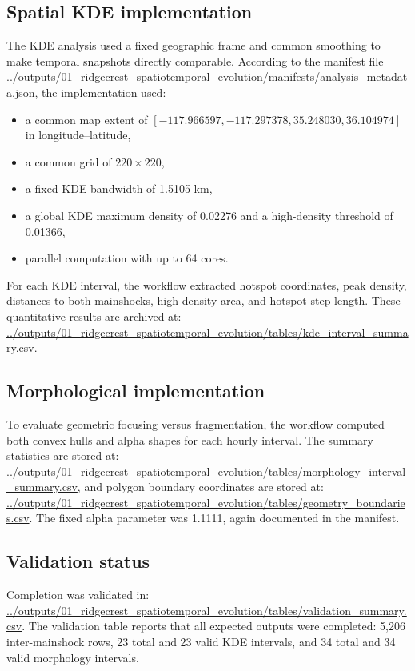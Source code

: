 \documentclass[11pt]{article}
\begin{document}
\subsection{Spatial KDE implementation}
The KDE analysis used a fixed geographic frame and common smoothing to make temporal snapshots directly comparable. According to the manifest file
\url{../outputs/01_ridgecrest_spatiotemporal_evolution/manifests/analysis_metadata.json}, the implementation used:
\begin{itemize}[leftmargin=2em]
    \item a common map extent of $[-117.966597, -117.297378, 35.248030, 36.104974]$ in longitude--latitude,
    \item a common grid of $220 \times 220$,
    \item a fixed KDE bandwidth of 1.5105 km,
    \item a global KDE maximum density of 0.02276 and a high-density threshold of 0.01366,
    \item parallel computation with up to 64 cores.
\end{itemize}
For each KDE interval, the workflow extracted hotspot coordinates, peak density, distances to both mainshocks, high-density area, and hotspot step length. These quantitative results are archived at:
\url{../outputs/01_ridgecrest_spatiotemporal_evolution/tables/kde_interval_summary.csv}.

\subsection{Morphological implementation}
To evaluate geometric focusing versus fragmentation, the workflow computed both convex hulls and alpha shapes for each hourly interval. The summary statistics are stored at:
\url{../outputs/01_ridgecrest_spatiotemporal_evolution/tables/morphology_interval_summary.csv},
and polygon boundary coordinates are stored at:
\url{../outputs/01_ridgecrest_spatiotemporal_evolution/tables/geometry_boundaries.csv}.
The fixed alpha parameter was 1.1111, again documented in the manifest.

\subsection{Validation status}
Completion was validated in:
\url{../outputs/01_ridgecrest_spatiotemporal_evolution/tables/validation_summary.csv}.
The validation table reports that all expected outputs were completed: 5,206 inter-mainshock rows, 23 total and 23 valid KDE intervals, and 34 total and 34 valid morphology intervals.
\end{document}
